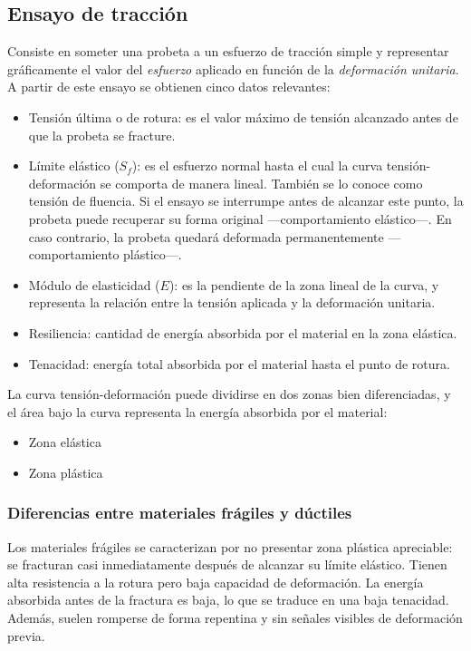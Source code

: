 \documentclass[spanish,11pt,a4paper]{article}
\begin{document}
	\subsection{Ensayo de tracción}
	Consiste en someter una probeta a un esfuerzo de tracción simple y representar gráficamente el valor del \emph{esfuerzo} aplicado en función de la \emph{deformación unitaria}. A partir de este ensayo se obtienen cinco datos relevantes:
	\begin{itemize}
		\item Tensión última o de rotura: es el valor máximo de tensión alcanzado antes de que la probeta se fracture.
		\item Límite elástico ($S_f$): es el esfuerzo normal hasta el cual la curva tensión-deformación se comporta de manera lineal. También se lo conoce como tensión de fluencia. Si el ensayo se interrumpe antes de alcanzar este punto, la probeta puede recuperar su forma original —comportamiento elástico—. En caso contrario, la probeta quedará deformada permanentemente —comportamiento plástico—.
		\item Módulo de elasticidad ($E$): es la pendiente de la zona lineal de la curva, y representa la relación entre la tensión aplicada y la deformación unitaria.
		\item Resiliencia: cantidad de energía absorbida por el material en la zona elástica.
		\item Tenacidad: energía total absorbida por el material hasta el punto de rotura.
	\end{itemize}
	
	La curva tensión-deformación puede dividirse en dos zonas bien diferenciadas, y el área bajo la curva representa la energía absorbida por el material:
	\begin{itemize}
		\item Zona elástica
		\item Zona plástica
	\end{itemize}
	
	\subsubsection{Diferencias entre materiales frágiles y dúctiles}
	
	Los materiales frágiles se caracterizan por no presentar zona plástica apreciable: se fracturan casi inmediatamente después de alcanzar su límite elástico. Tienen alta resistencia a la rotura pero baja capacidad de deformación. La energía absorbida antes de la fractura es baja, lo que se traduce en una baja tenacidad. Además, suelen romperse de forma repentina y sin señales visibles de deformación previa.
	
\end{document}
